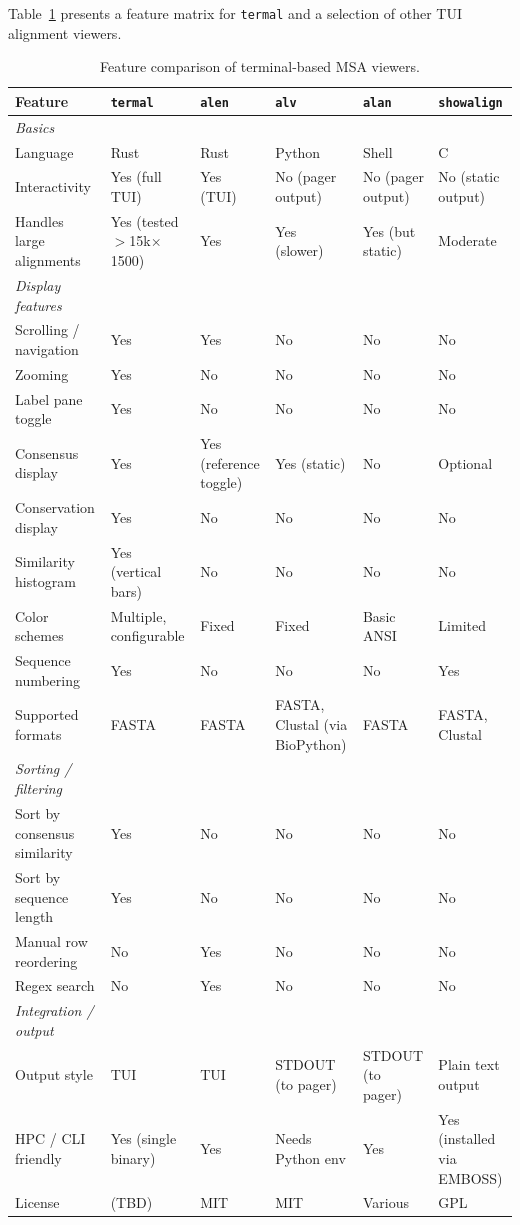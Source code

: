 \documentclass[11pt]{article}
\begin{document}
Table~\ref{tbl:comparison} presents a feature matrix for \texttt{termal} and a
selection of other TUI alignment viewers.

\begin{landscape}
\begin{table}[ht]
\centering
\small
\begin{tabularx}{\linewidth}{lXXXXX}
\toprule
\textbf{Feature} & \textbf{\texttt{termal}} & \textbf{\texttt{alen}} & \textbf{\texttt{alv}} & \textbf{\texttt{alan}} & \textbf{\texttt{showalign}} \\
\midrule
\textit{Basics} \\
Language & Rust & Rust & Python & Shell & C \\
Interactivity & Yes (full TUI) & Yes (TUI) & No (pager output) & No (pager output) & No (static output) \\
Handles large alignments & Yes (tested $>$15k$\times$1500) & Yes & Yes (slower) & Yes (but static) & Moderate \\
\midrule
\textit{Display features} \\
Scrolling / navigation & Yes & Yes & No & No & No \\
Zooming & Yes & No & No & No & No \\
Label pane toggle & Yes & No & No & No & No \\
Consensus display & Yes & Yes (reference toggle) & Yes (static) & No & Optional \\
Conservation display & Yes & No & No & No & No \\
Similarity histogram & Yes (vertical bars) & No & No & No & No \\
Color schemes & Multiple, configurable & Fixed & Fixed & Basic ANSI & Limited \\
Sequence numbering & Yes & No & No & No & Yes \\
Supported formats & FASTA & FASTA & FASTA, Clustal (via BioPython) & FASTA & FASTA, Clustal \\
\midrule
\textit{Sorting / filtering} \\
Sort by consensus similarity & Yes & No & No & No & No \\
Sort by sequence length & Yes & No & No & No & No \\
Manual row reordering & No & Yes & No & No & No \\
Regex search & No & Yes & No & No & No \\
\midrule
\textit{Integration / output} \\
Output style & TUI & TUI & STDOUT (to pager) & STDOUT (to pager) & Plain text output \\
HPC / CLI friendly & Yes (single binary) & Yes & Needs Python env & Yes & Yes (installed via EMBOSS) \\
	License & (TBD) & MIT & MIT & Various & GPL \\
\bottomrule
\end{tabularx}
\caption{Feature comparison of terminal-based MSA viewers.}
\label{tbl:comparison}
\end{table}
\end{landscape}
\end{document}
